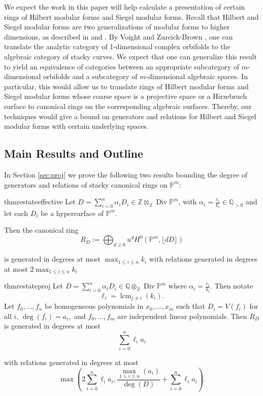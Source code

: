 \documentclass{amsart}
\theoremstyle{plain}
\theoremstyle{definition}
\theoremstyle{remark}
\numberwithin{equation}{section}
\newcommand\ssec{\subsection}
\newcommand\bq{{\mathbb Q}}
\newcommand\bp{{\mathbb P}}
\newcommand\bz{{\mathbb Z}}
\DeclareMathOperator\di{Div}
\newcommand\bida{a}
\DeclareMathOperator{\lcm}{lcm}
\begin{document}
We expect the work in this paper will help calculate a presentation of certain rings of
Hilbert 
modular forms and Siegel modular forms. Recall that Hilbert and Siegel 
modular forms are two generalizations of modular forms to higher dimensions,
as described in \cite{geer:siegel-modular} and \cite{bruinier:hilbert-modular}.
By Voight and Zureick-Brown \cite[Proposition 6.1.5]{vzb:stacky}, 
one can translate the analytic category of 1-dimensional complex orbifolds to
the algebraic category of stacky curves. 
We expect that one can generalize this result to yield an equivalence of
categories between an appropriate subcategory of $m$-dimensional orbifolds and
a subcategory of $m$-dimensional algebraic spaces.
In particular, this would allow us to translate rings of Hilbert modular forms
and Siegel modular forms whose coarse space is a projective space or a
Hirzebruch surface to canonical rings on the corresponding algebraic surfaces.
Thereby, our techniques would give a bound on generators and relations for
Hilbert and Siegel modular forms with certain underlying spaces.

\ssec{Main Results and Outline}

In Section \ref{sec:proj} we prove the following two results bounding
the degree of generators and relations of
stacky canonical rings on $\bp^m$:
\begin{restatable}{thm}{restateeffective}
\label{thm:proj-effective-intro}
Let $D = \sum_{i = 0}^{n} \alpha_i D_i \in \bz \otimes_\bz \di \bp^m$, with $\alpha_i =
\frac{c_i}{k_i} \in \bq_{> 0}$ and let each $D_i$ be a hypersurface of
$\bp^m$.

Then the canonical ring
\[
	R_D := \bigoplus_{d \geq 0} u^d H^0(\bp^m, \lfloor dD \rfloor)
\]

\noindent
is generated in degrees at most $\max_{1 \leq i \leq n}{k_i}$ with
relations generated in degrees at most $2 \max_{1 \leq i \leq n}{k_i}$
\end{restatable}

\begin{restatable}{thm}{restateproj}
\label{thm:proj-generators-relations}
Let $D = \sum_{i=0}^n \alpha_i D_i \in \bq \otimes_\bz \di \bp^m$ where $\alpha_i = \frac{c_i}{k_i}$.
Then notate
\[\ell_i = \lcm_{j\ne i}(k_i).\] 
Let
$f_0, \ldots, f_n$ be homogeneous polynomials in $x_0, \ldots, x_m$ such that
$D_i = V(f_i)$ for all $i$, $\deg(f_i) = a_i,$ and $f_0,\ldots, f_m$ are independent linear polynomials. 
Then $R_D$ is generated in degrees at most 
\[
	\sum_{i=0}^n \ell_i a_i
\]

\noindent
with relations generated in degrees at most
\[
	\max \left(2 \sum_{i=0}^n \ell_i a_i, \frac{\max_{1\le i \le n}
	(	\bida_i)}{\deg(D)} + \sum_{i=0}^n \ell_i a_i \right).
\]
\end{restatable}
\end{document}
